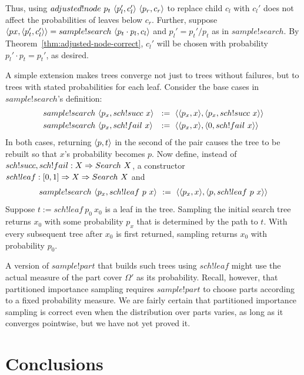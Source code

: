 Thus, using $adjusted!node~p_t~\langle{p_l',c_l'}\rangle~\langle{p_r,c_r}\rangle$ to replace child $c_l$ with $c_l'$ does not affect the probabilities of leaves below $c_r$.
Further, suppose $\langle{px,\langle{p_t',c_l'}\rangle}\rangle = sample!search~\langle{p_t \cdot p_l,c_l}\rangle$ and $p_l' = p_t'{/}p_t$ as in $sample!search$.
By Theorem~\ref{thm:adjusted-node-correct}, $c_l'$ will be chosen with probability $p_l' \cdot p_t = p_t'$, as desired.

A simple extension makes trees converge not just to trees without failures, but to trees with stated probabilities for each leaf.
Consider the base cases in $sample!search$'s definition:
\begin{equation}
\begin{aligned}
	&sample!search~\pair{p_x,sch!succ~x}&&\!\! :=\ \pair{\pair{p_x,x},\pair{p_x,sch!succ~x}} \\
	&sample!search~\pair{p_x,sch!fail~x}&&\!\! :=\ \pair{\pair{p_x,x},\pair{0,sch!fail~x}} \\
\end{aligned}
\end{equation}
In both cases, returning $\langle{p,t}\rangle$ in the second of the pair causes the tree to be rebuilt so that $x$'s probability becomes $p$.
Now define, instead of $sch!succ,sch!fail : X \Rightarrow Search~X$, a constructor $sch!leaf : [0,1] \Rightarrow X \Rightarrow Search~X$ and
\begin{equation}
\begin{aligned}
	sample!search~\pair{p_x,sch!leaf~p~x}&&\!\! :=\ \pair{\pair{p_x,x},\pair{p,sch!leaf~p~x}} \\
\end{aligned}
\end{equation}
Suppose $t := sch!leaf~p_0~x_0$ is a leaf in the tree.
Sampling the initial search tree returns $x_0$ with some probability $p_x$ that is determined by the path to $t$.
With every subsequent tree after $x_0$ is first returned, sampling returns $x_0$ with probability $p_0$.

A version of $sample!part$ that builds such trees using $sch!leaf$ might use the actual measure of the part cover $\Omega'$ as its probability.
Recall, however, that partitioned importance sampling requires $sample!part$ to choose parts according to a fixed probability measure.
We are fairly certain that partitioned importance sampling is correct even when the distribution over parts varies, as long as it converges pointwise, but we have not yet proved it.

\section{Conclusions}

